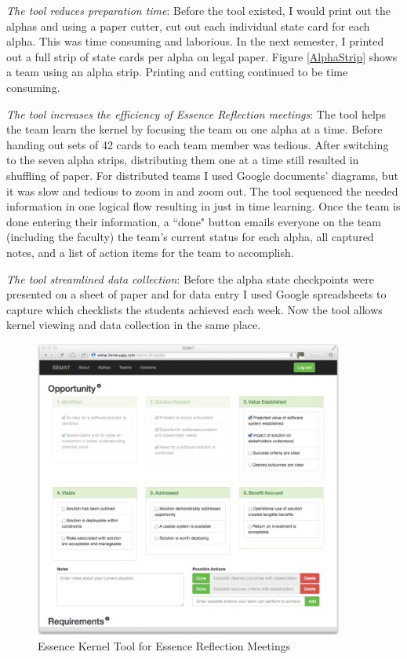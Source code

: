 \documentclass[preprint,12pt,3p]{elsarticle}
\begin{document}
\textit{The tool reduces preparation time}: Before the tool existed, I would print out the alphas and using a paper cutter, cut out each individual state card for each alpha. This was time consuming and laborious.  In the next semester, I printed out a full strip of state cards per alpha on legal paper. Figure \ref{AlphaStrip} shows a team using an alpha strip. Printing and cutting continued to be time consuming. 

\textit{The tool increases the efficiency of Essence Reflection meetings}: The tool helps the team learn the kernel by focusing the team on one alpha at a time. Before handing out sets of 42 cards to each team member was tedious. After switching to the seven alpha strips, distributing them one at a time still resulted in shuffling of paper. For distributed teams I used Google documents' diagrams, but it was slow and tedious to zoom in and zoom out. The tool sequenced the needed information in one logical flow  resulting in just in time learning. Once the team is done entering their information, a ``done" button emails everyone on the team (including the faculty) the team's current status for each alpha, all captured notes, and a list of action items for the team to accomplish. 

\textit{The tool streamlined data collection}: Before the alpha state checkpoints were presented on a sheet of paper and for data entry I used Google spreadsheets to capture which checklists the students achieved each week. Now the tool allows kernel viewing and data collection in the same place. 

\begin{figure}[ht]
\centering
\includegraphics[width=4.00in]{tool_photos/tool_photo}
\caption{Essence Kernel Tool for Essence Reflection Meetings}
\label{EssenceToolScreenshot}
\end{figure}
\end{document}
